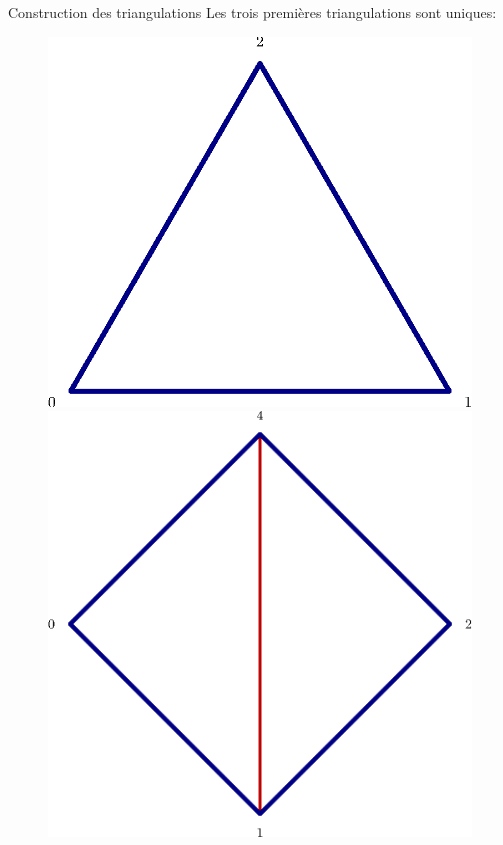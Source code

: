 \documentclass[french,xcolor=dvipsnames]{beamer}
\begin{document}
		\begin{frame}{Construction des triangulations}
			Les trois premières triangulations sont uniques:
			\begin{figure}
				\includegraphics[scale=0.2]{triangu_3.eps}
				\includegraphics[scale=0.2]{triangu_4.eps}

\end{figure}
\end{frame}
\end{document}
